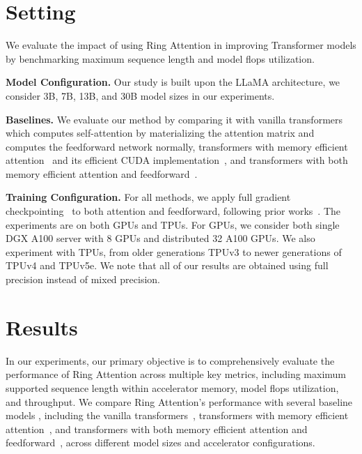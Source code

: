 \documentclass{article}
\newcommand{\ours}{{Ring Attention}\xspace}
\newcommand{\oursabb}{{Ring Attention}\xspace}
\begin{document}
\section{Setting}
We evaluate the impact of using \ours in improving Transformer models by benchmarking maximum sequence length and model flops utilization.

\textbf{Model Configuration.}
Our study is built upon the LLaMA architecture, we consider 3B, 7B, 13B, and 30B model sizes in our experiments.

\textbf{Baselines.}
We evaluate our method by comparing it with vanilla transformers~\citep{vaswani2017attention} which computes self-attention by materializing the attention matrix and computes the feedforward network normally, transformers with memory efficient attention~\citep{rabe2021self} and its efficient CUDA implementation~\citep{dao2022flashattention}, and transformers with both memory efficient attention and feedforward~\citep{liu2023blockwise}.


\textbf{Training Configuration.}
For all methods, we apply full gradient checkpointing~\citep{chen2016training} to both attention and feedforward, following prior works~\citep{rabe2021self, liu2023blockwise}.
The experiments are on both GPUs and TPUs. For GPUs, we consider both single DGX A100 server with 8 GPUs and distributed 32 A100 GPUs.
We also experiment with TPUs, from older generations TPUv3 to newer generations of TPUv4 and TPUv5e.
We note that all of our results are obtained using full precision instead of mixed precision.

\section{Results}
\label{sec:experiment}
In our experiments, our primary objective is to comprehensively evaluate the performance of \ours across multiple key metrics, including maximum supported sequence length within accelerator memory, model flops utilization, and throughput.
We compare \oursabb's performance with several baseline models
, including the vanilla transformers~\citep{vaswani2017attention}, transformers with memory efficient attention~\citep{rabe2021self}, and transformers with both memory efficient attention and feedforward~\citep{liu2023blockwise},
across different model sizes and accelerator configurations.
\end{document}
